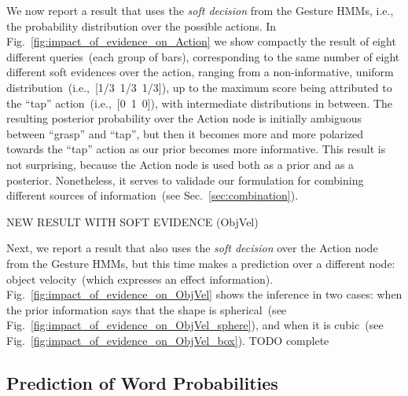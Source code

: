 We now report a result that uses the \emph{soft decision} from the Gesture \acp{HMM}, i.e., the probability distribution over the possible actions.
In Fig.~\ref{fig:impact_of_evidence_on_Action} we show compactly the result of eight different queries~(each group of bars), corresponding to the same number of eight different soft evidences over the action, ranging from a non-informative, uniform distribution~(i.e.,~[1/3~1/3~1/3]), up to the maximum score being attributed to the ``tap'' action~(i.e.,~[0~1~0]), with intermediate distributions in between.
The resulting posterior probability over the Action node is initially ambiguous between ``grasp'' and ``tap'', but then it becomes more and more polarized towards the ``tap'' action as our prior becomes more informative.
This result is not surprising, because the Action node is used both as a prior and as a posterior.
Nonetheless, it serves to validade our formulation for combining different sources of information~(see Sec.~\ref{sec:combination}).

NEW RESULT WITH SOFT EVIDENCE (ObjVel)

\begin{figure*}
\centering
{} \quad
%
\caption{Predictions about the object velocity of different objects, when given probabilistic soft evidence about the action.}
\label{fig:impact_of_evidence_on_ObjVel}
\end{figure*}

Next, we report a result that also uses the \emph{soft decision} over the Action node from the Gesture \acp{HMM}, but this time makes a prediction over a different node: object velocity~(which expresses an effect information).
Fig.~\ref{fig:impact_of_evidence_on_ObjVel} shows the inference in two cases: when the prior information says that the shape is spherical~(see Fig.~\ref{fig:impact_of_evidence_on_ObjVel_sphere}), and when it is cubic~(see Fig.~\ref{fig:impact_of_evidence_on_ObjVel_box}).
TODO complete

\subsection{Prediction of Word Probabilities}


